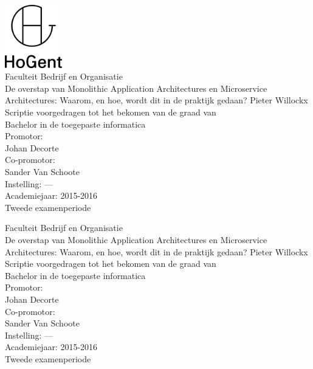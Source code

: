 \documentclass[pdftex,a4paper,12pt,twoside]{report}
\newcommand{\emptypage}{
\newpage
\thispagestyle{empty}
\mbox{}
\newpage
}
\newcommand{\student}{Pieter Willockx}
\newcommand{\promotor}{Johan Decorte}
\newcommand{\copromotor}{Sander Van Schoote}
\newcommand{\instelling}{---}
\newcommand{\titel}{De overstap van Monolithic Application Architectures en Microservice Architectures: Waarom, en hoe, wordt dit in de praktijk gedaan?}
\newcommand{\faculteit}{Faculteit Bedrijf en Organisatie}
\newcommand{\rapporttype}{Scriptie voorgedragen tot het bekomen van de graad van\\Bachelor in de toegepaste informatica}
\newcommand{\academiejaar}{2015-2016}
\newcommand{\examenperiode}{Tweede examenperiode}
\begin{document}

\begin{titlepage}
  \begin{center}

    \begingroup
    \rmfamily
    \includegraphics[width=2.5cm]{img/HG-beeldmerk-woordmerk}\\[.5cm]
    \faculteit\\[3cm]
    \titel
    \vfill
    \student\\[3.5cm]
    \rapporttype\\[2cm]
    Promotor:\\
    \promotor\\
    Co-promotor:\\
    \copromotor\\[2.5cm]
    Instelling: \instelling\\[.5cm]
    Academiejaar: \academiejaar\\[.5cm]
    \examenperiode
    \endgroup

  \end{center}
  \restoregeometry
\end{titlepage}


\emptypage


\begin{titlepage}
  \begin{center}

    \begingroup
    \rmfamily
    \faculteit\\[3cm]
    \titel
    \vfill
    \student\\[3.5cm]
    \rapporttype\\[2cm]
    Promotor:\\
    \promotor\\
    Co-promotor:\\
    \copromotor\\[2.5cm]
    Instelling: \instelling\\[.5cm]
    Academiejaar: \academiejaar\\[.5cm]
    \examenperiode
    \endgroup

  \end{center}
  \restoregeometry
\end{titlepage}
\end{document}
